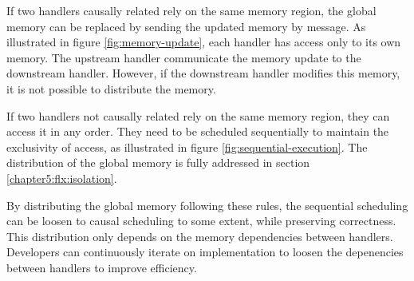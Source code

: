 If two handlers causally related rely on the same memory region, the global memory can be replaced by sending the updated memory by message.
As illustrated in figure \ref{fig:memory-update}, each handler has access only to its own memory.
The upstream handler communicate the memory update to the downstream handler.
However, if the downstream handler modifies this memory, it is not possible to distribute the memory.

If two handlers not causally related rely on the same memory region, they can access it in any order.
They need to be scheduled sequentially to maintain the exclusivity of access, as illustrated in figure \ref{fig:sequential-execution}.
The distribution of the global memory is fully addressed in section \ref{chapter5:flx:isolation}.

By distributing the global memory following these rules, the sequential scheduling can be loosen to causal scheduling to some extent, while preserving correctness.
This distribution only depends on the memory dependencies between handlers.
Developers can continuously iterate on implementation to loosen the depenencies between handlers to improve efficiency.
















